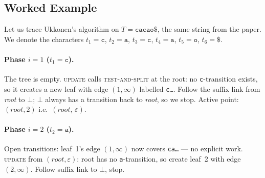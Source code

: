 \subsection{Worked Example}

Let us trace Ukkonen's algorithm on $T = \texttt{cacao\$}$, the same
string from the paper.
We denote the characters $t_1 = \texttt{c}$, $t_2 = \texttt{a}$,
$t_3 = \texttt{c}$, $t_4 = \texttt{a}$, $t_5 = \texttt{o}$,
$t_6 = \texttt{\$}$.

\paragraph{Phase $i=1$ ($t_1 = \texttt{c}$).}
The tree is empty.
\textsc{update} calls \textsc{test-and-split} at the root: no
\texttt{c}-transition exists, so it creates a new leaf with edge
$(1, \infty)$ labelled \texttt{c\ldots}.
Follow the suffix link from \textit{root} to $\bot$;
$\bot$ always has a transition back to \textit{root}, so we stop.
Active point: $(root, 2)$ i.e.\ $(\textit{root},\, \varepsilon)$.

\begin{center}
\end{center}

\paragraph{Phase $i=2$ ($t_2 = \texttt{a}$).}
Open transitions: leaf~1's edge $(1,\infty)$ now covers
\texttt{ca\ldots} --- no explicit work.
\textsc{update} from $(root, \varepsilon)$: root has no
\texttt{a}-transition, so create leaf~2 with edge $(2,\infty)$.
Follow suffix link to $\bot$, stop.

